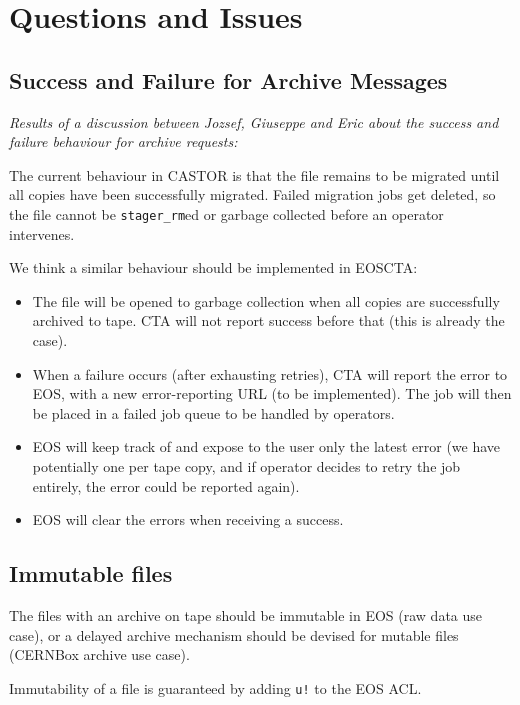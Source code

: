 \newcommand{\resolved}{{\color{cern@blue}[RESOLVED]}}
\chapter{Questions and Issues}
\label{questions_and_issues}

\section{Success and Failure for Archive Messages}

\textit{Results of a discussion between Jozsef, Giuseppe and Eric about the success and failure behaviour for archive requests:}

The current behaviour in CASTOR is that the file remains to be migrated until all copies have been successfully
migrated. Failed migration jobs get deleted, so the file cannot be \texttt{stager\_rm}ed or garbage collected
before an operator intervenes.

We think a similar behaviour should be implemented in EOSCTA:

\begin{itemize}
   \item The file will be opened to garbage collection when all copies are successfully archived to tape.
      CTA will not report success before that (this is already the case).
   \item When a failure occurs (after exhausting retries), CTA will report the error to EOS, with a new
      error-reporting URL (to be implemented). The job will then be placed in a failed job queue to be
      handled by operators.
   \item EOS will keep track of and expose to the user only the latest error (we have potentially one
      per tape copy, and if operator decides to retry the job entirely, the error could be reported again).
   \item EOS will clear the errors when receiving a success.
\end{itemize}

\section{Immutable files}

The files with an archive on tape should be immutable in EOS (raw data use case), or a delayed archive mechanism
should be devised for mutable files (CERNBox archive use case).

Immutability of a file is guaranteed by adding \texttt{u!} to the EOS ACL.

